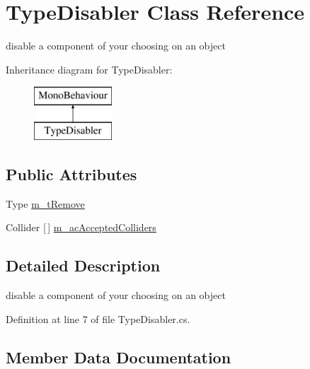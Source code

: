\hypertarget{class_type_disabler}{}\section{Type\+Disabler Class Reference}
\label{class_type_disabler}


disable a component of your choosing on an object  


Inheritance diagram for Type\+Disabler\+:\begin{figure}[H]
\begin{center}
\leavevmode
\includegraphics[height=2.000000cm]{class_type_disabler}
\end{center}
\end{figure}
\subsection*{Public Attributes}
\begin{DoxyCompactItemize}
\item 
Type \mbox{\hyperlink{class_type_disabler_a7418c0a584908fe09a45613a1297f3f3}{m\+\_\+t\+Remove}}
\item 
Collider \mbox{[}$\,$\mbox{]} \mbox{\hyperlink{class_type_disabler_aa6c42e3833e3eae9e4d3b15e659a6fe7}{m\+\_\+ac\+Accepted\+Colliders}}
\end{DoxyCompactItemize}


\subsection{Detailed Description}
disable a component of your choosing on an object 



Definition at line 7 of file Type\+Disabler.\+cs.



\subsection{Member Data Documentation}
\mbox{\label{class_type_disabler_aa6c42e3833e3eae9e4d3b15e659a6fe7}} 
